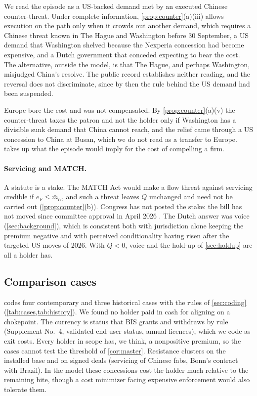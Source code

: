 We read the episode as a US-backed demand met by an executed Chinese counter-threat. Under complete information, \cref{prop:counter}(a)(iii) allows execution on the path only when it crowds out another demand, which requires a Chinese threat known in The Hague and Washington before 30 September, a US demand that Washington shelved because the Nexperia concession had become expensive, and a Dutch government that conceded expecting to bear the cost. The alternative, outside the model, is that The Hague, and perhaps Washington, misjudged China's resolve. The public record establishes neither reading, and the reversal does not discriminate, since by then the rule behind the US demand had been suspended.

Europe bore the cost and was not compensated. By \cref{prop:counter}(a)(v) the counter-threat taxes the patron and not the holder only if Washington has a divisible sunk demand that China cannot reach, and the relief came through a US concession to China at Busan, which we do not read as a transfer to Europe.  takes up what the episode would imply for the cost of compelling a firm.

\paragraph{Servicing and MATCH.} A statute is a stake. The MATCH Act would make a flow threat against servicing credible if $e_F\le\bar m_U$, and such a threat leaves $Q$ unchanged and need not be carried out (\cref{prop:counter}(b)). Congress has not posted the stake: the bill has not moved since committee approval in April 2026 \citep{hr8170}. The Dutch answer was voice (\cref{sec:background}), which is consistent both with jurisdiction alone keeping the premium negative and with perceived conditionality having risen after the targeted US moves of 2026. With $Q<0$, voice and the hold-up of \cref{sec:holdup} are all a holder has.

\subsection{Comparison cases}\label{sec:cases}

 codes four contemporary and three historical cases with the rules of \cref{sec:coding} (\cref{tab:cases,tab:history}). We found no holder paid in cash for aligning on a chokepoint. The currency is status that BIS grants and withdraws by rule (Supplement No.~4, validated end-user status, annual licences), which we code as exit costs. Every holder in scope has, we think, a nonpositive premium, so the cases cannot test the threshold of \cref{cor:master}. Resistance clusters on the installed base and on signed deals (servicing of Chinese fabs, Bonn's contract with Brazil). In the model these concessions cost the holder much relative to the remaining bite, though a cost minimizer facing expensive enforcement would also tolerate them.

